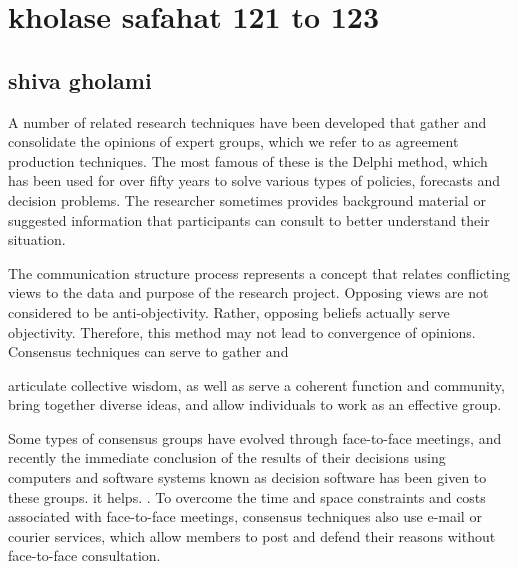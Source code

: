 \documentclass [12pt]{beamer}
\begin{document}
	
\section*{kholase safahat 121 to 123}
\subsection*{shiva gholami }	
\begin{frame}
\justifying	
A number of related research techniques have been developed that gather and consolidate the opinions of expert groups, which we refer to as agreement production techniques.  The most famous of these is the Delphi method, which has been used for over fifty years to solve various types of policies, forecasts and decision problems.
The researcher sometimes provides background material or suggested information that participants can consult to better understand their situation.
\end{frame}

\begin{frame}
\justifying	
The communication structure process represents a concept that relates conflicting views to the data and purpose of the research project.  Opposing views are not considered to be anti-objectivity.  Rather, opposing beliefs actually serve objectivity.  Therefore, this method may not lead to convergence of opinions.
Consensus techniques can serve to gather and 

articulate collective wisdom, as well as serve a coherent function and community, bring together diverse ideas, and allow individuals to work as an effective group.
\end{frame}

\begin{frame}
\justifying	
Some types of consensus groups have evolved through face-to-face meetings, and recently the immediate conclusion of the results of their decisions using computers and software systems known as decision software has been given to these groups.  it helps.  .  To overcome the time and space constraints and costs associated with face-to-face meetings, consensus techniques also use e-mail or courier services, which allow members to post and defend their reasons without face-to-face consultation.
\end{frame}
\end{document}
